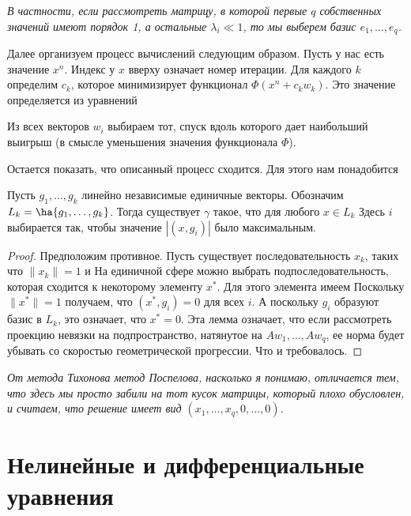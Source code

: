 \documentclass[a4paper]{article}
\begin{document}
\textsl{В частности, если рассмотреть матрицу, в которой первые $q$
  собственных значений имеют порядок 1, а остальные $\lambda_i\ll 1$,
  то мы выберем базис $e_1,\dots, e_q$. }

 Далее организуем процесс вычислений следующим образом. Пусть у нас
 есть значение $x^n$.  Индекс у $x$ вверху означает номер итерации.
 Для каждого $k$ определим $c_k$, которое минимизирует функционал
 $\Phi(x^n+c_kw_k)$. Это значение определяется из уравнений
  

Из всех векторов $w_i$ выбираем тот, спуск вдоль которого дает
наибольший выигрыш (в смысле уменьшения значения функционала $\Phi$).

Остается показать, что описанный процесс сходится. Для этого нам
понадобится
\begin{lemma}
 Пусть $g_1, \dots, g_k$ линейно независимые единичные векторы.
 Обозначим $L_k = \ha{g_1, \dots, g_k}$. Тогда существует $\gamma$
 такое, что для любого $x\in L_k$   Здесь $i$ выбирается так, чтобы значение
 $|(x, g_i)|$ было максимальным.
\end{lemma}
\begin{proof}
Предположим противное. Пусть существует последовательность $x_k$,
таких что $\|x_k\|=1$ и   На
единичной сфере можно выбрать подпоследовательность, которая сходится
к некоторому элементу $x^*$. Для этого элемента имеем  Поскольку
$\|x^*\|=1$ получаем, что $(x^*, g_i)=0$ для всех $i$. А поскольку
$g_i$ образуют базис в $L_k$, это означает, что $x^*=0$. Эта лемма
означает, что если рассмотреть проекцию невязки на подпространство,
натянутое на $Aw_1, \dots, Aw_q$, ее норма будет убывать со скоростью
геометрической прогрессии. Что и требовалось.
\end{proof}

\textsl{От метода Тихонова метод Поспелова, насколько я понимаю,
  отличается тем, что здесь мы просто забили на тот кусок матрицы,
  который плохо обусловлен, и считаем, что решение имеет вид $(x_1,
  \dots, x_q, 0,\dots,0)$.}


\section{Нелинейные и дифференциальные уравнения}
\end{document}

